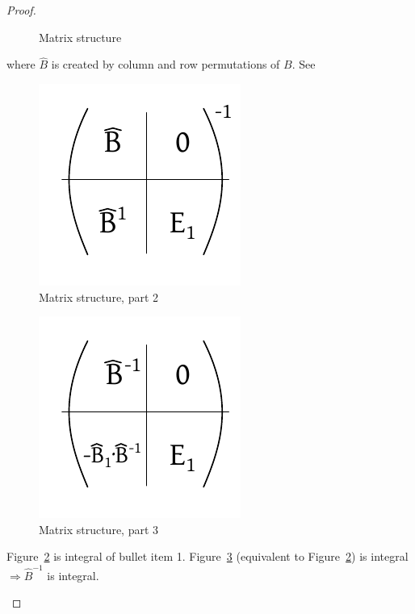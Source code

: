 \documentclass{article}
\begin{document}
\begin{proof}
\begin{itemize}
\begin{itemize}
\begin{figure}[!ht]
\begin{center}
              \caption{Matrix structure}
              \label{fig:matstr}
            \end{center}
          \end{figure}
          where $\hat B$ is created by column and row permutations of $B$. See
          \begin{figure}[!ht]
            \begin{center}
              \includegraphics{img/matrix_structure_2.pdf}
              \caption{Matrix structure, part 2}
              \label{fig:matstr2}
            \end{center}
          \end{figure}
          \begin{figure}[!ht]
            \begin{center}
              \includegraphics{img/matrix_structure_3.pdf}
              \caption{Matrix structure, part 3}
              \label{fig:matstr3}
            \end{center}
          \end{figure}
          Figure~\ref{fig:matstr2} is integral of bullet item 1.
          Figure~\ref{fig:matstr3} (equivalent to Figure~\ref{fig:matstr2}) is integral $\Rightarrow \hat{B}^{-1}$ is integral.


\end{itemize}
\end{itemize}
\end{proof}
\end{document}
